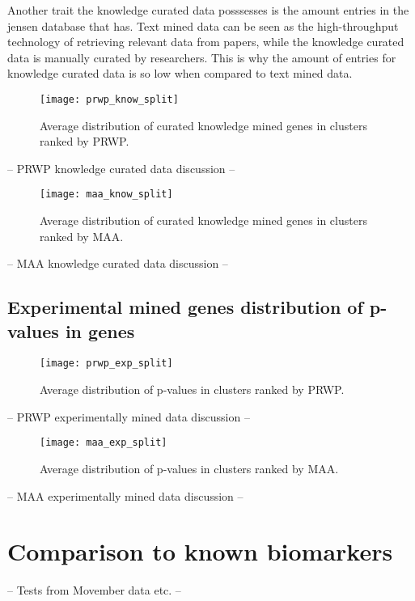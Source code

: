 Another trait the knowledge curated data posssesses is the amount entries in the
\gls{jensen} database that has. Text mined data can be seen as the
high-throughput technology of retrieving relevant data from papers, while the
knowledge curated data is manually curated by researchers. This is why the
amount of entries for knowledge curated data is so low when compared to text
mined data.

\begin{sidewaysfigure}[H]
    \label{fig:know-iref-prwp}
    \texttt{[image: prwp\_know\_split]}
    \caption{Average distribution of curated knowledge mined genes in clusters
    ranked by PRWP.}
\end{sidewaysfigure}
-- PRWP knowledge curated data discussion --

\begin{sidewaysfigure}[H]
    \label{fig:know-iref-maa}
    \texttt{[image: maa\_know\_split]}
    \caption{Average distribution of curated knowledge mined genes in clusters
    ranked by MAA.}
\end{sidewaysfigure}
-- MAA knowledge curated data discussion --

\subsection{Experimental mined genes distribution of p-values in genes}
\begin{sidewaysfigure}[H]
    \label{fig:exp-iref-prwp}
    \texttt{[image: prwp\_exp\_split]}
    \caption{Average distribution of p-values in clusters ranked by PRWP.}
\end{sidewaysfigure}
-- PRWP experimentally mined data discussion --

\begin{sidewaysfigure}[H]
    \label{fig:exp-iref-maa}
    \texttt{[image: maa\_exp\_split]}
    \caption{Average distribution of p-values in clusters ranked by MAA.}
\end{sidewaysfigure}
-- MAA experimentally mined data discussion --


\section{Comparison to known biomarkers}
-- Tests from Movember data etc. --


